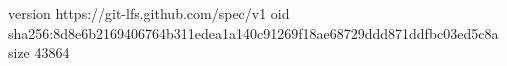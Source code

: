 version https://git-lfs.github.com/spec/v1
oid sha256:8d8e6b2169406764b311edea1a140c91269f18ae68729ddd871ddfbc03ed5c8a
size 43864
